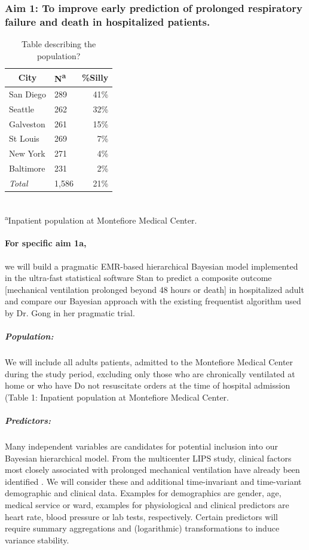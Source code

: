 \documentclass[11pt,notitlepage]{article}
\begin{document}
\subsubsection*{Aim 1: To improve early prediction of prolonged respiratory failure and death in hospitalized patients.}

\begin{table} %
\caption{Table describing the population?}
\begin{center}
\begin{tabular}{l l r}
\toprule
\multicolumn{1}{c}{City} & {N\textsuperscript{a}} & {\%Silly}\\
\midrule
San Diego & 289 & 41\%\\
Seattle & 262 & 32\%\\
Galveston & 261 & 15\%\\
St Louis & 269 & 7\%\\
New York & 271 & 4\%\\
Baltimore & 231 & 2\%\\
\emph{Total} & 1,586 & 21\%\\
\hline
\end{tabular}\\
\footnotesize\textsuperscript{a}{Inpatient population at Montefiore Medical Center.}
\end{center}
\label{default}
\end{table}

\paragraph*{For specific aim 1a,} we will build a pragmatic EMR-based hierarchical Bayesian model implemented in the ultra-fast statistical software Stan to predict a composite outcome [mechanical ventilation prolonged beyond 48 hours or death] in hospitalized adult and compare our Bayesian approach with the existing frequentist algorithm used by Dr. Gong in her pragmatic trial.

\subparagraph*{Population:}
We will include all adults patients, admitted to the Montefiore Medical Center during the study period, excluding only those who are chronically ventilated at home or who have Do not resuscitate orders at the time of hospital admission (Table 1: Inpatient population at Montefiore Medical Center. 

\subparagraph*{Predictors:}
Many independent variables are candidates for potential inclusion into our Bayesian hierarchical model. From the multicenter LIPS study, clinical factors most closely associated with prolonged mechanical ventilation have already been identified \cite{Herridge_12594312}. We will consider these and additional time-invariant and time-variant demographic and clinical data. Examples for demographics are gender, age, medical service or ward, examples for physiological and clinical predictors are heart rate, blood pressure or lab tests, respectively. Certain predictors will require summary aggregations and (logarithmic) transformations to induce variance stability.
\end{document}

